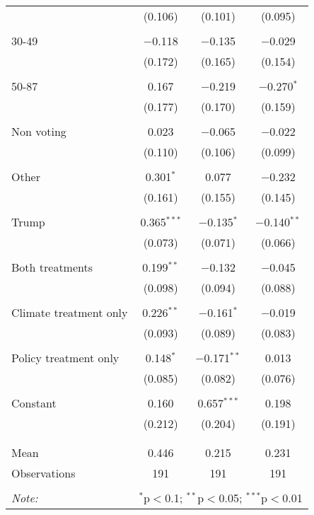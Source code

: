\begin{tabular}{@{\extracolsep{5pt}}lccc}
  & (0.106) & (0.101) & (0.095) \\ 
  & & & \\ 
 30-49 & $-$0.118 & $-$0.135 & $-$0.029 \\ 
  & (0.172) & (0.165) & (0.154) \\ 
  & & & \\ 
 50-87 & 0.167 & $-$0.219 & $-$0.270$^{*}$ \\ 
  & (0.177) & (0.170) & (0.159) \\ 
  & & & \\ 
 Non voting & 0.023 & $-$0.065 & $-$0.022 \\ 
  & (0.110) & (0.106) & (0.099) \\ 
  & & & \\ 
 Other & 0.301$^{*}$ & 0.077 & $-$0.232 \\ 
  & (0.161) & (0.155) & (0.145) \\ 
  & & & \\ 
 Trump & 0.365$^{***}$ & $-$0.135$^{*}$ & $-$0.140$^{**}$ \\ 
  & (0.073) & (0.071) & (0.066) \\ 
  & & & \\ 
 Both treatments & 0.199$^{**}$ & $-$0.132 & $-$0.045 \\ 
  & (0.098) & (0.094) & (0.088) \\ 
  & & & \\ 
 Climate treatment only & 0.226$^{**}$ & $-$0.161$^{*}$ & $-$0.019 \\ 
  & (0.093) & (0.089) & (0.083) \\ 
  & & & \\ 
 Policy treatment only & 0.148$^{*}$ & $-$0.171$^{**}$ & 0.013 \\ 
  & (0.085) & (0.082) & (0.076) \\ 
  & & & \\ 
 Constant & 0.160 & 0.657$^{***}$ & 0.198 \\ 
  & (0.212) & (0.204) & (0.191) \\ 
  & & & \\ 
\hline \\[-1.8ex] 
Mean & 0.446 & 0.215 & 0.231 \\ 
Observations & 191 & 191 & 191 \\ 
\hline 
\hline \\[-1.8ex] 
\textit{Note:}  & \multicolumn{3}{r}{$^{*}$p$<$0.1; $^{**}$p$<$0.05; $^{***}$p$<$0.01} \\ 
\end{tabular} 
